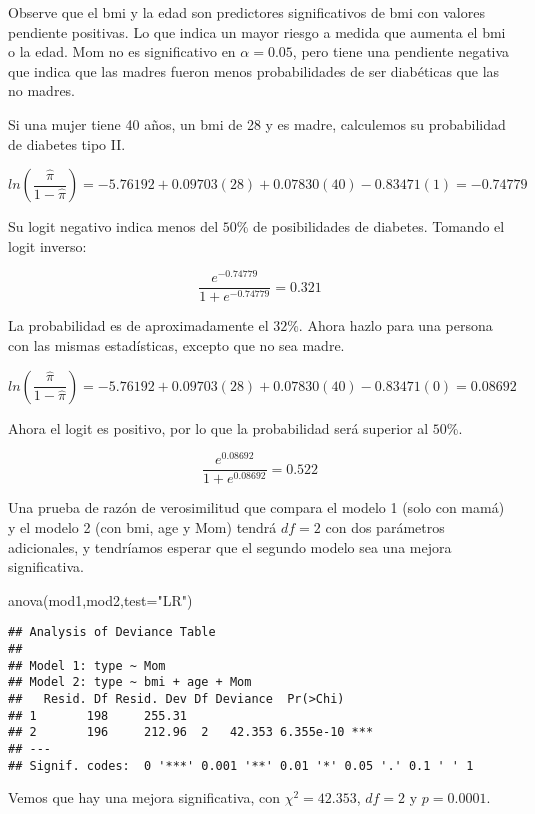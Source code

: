 \documentclass[
]{book}
\newenvironment{Shaded}{\begin{snugshade}}{\end{snugshade}}
\newcommand{\AttributeTok}[1]{\textcolor[rgb]{0.77,0.63,0.00}{#1}}
\newcommand{\FunctionTok}[1]{\textcolor[rgb]{0.00,0.00,0.00}{#1}}
\newcommand{\NormalTok}[1]{#1}
\newcommand{\StringTok}[1]{\textcolor[rgb]{0.31,0.60,0.02}{#1}}
\begin{document}
Observe que el bmi y la edad son predictores significativos de bmi con valores pendiente positivas.
Lo que indica un mayor riesgo a medida que aumenta el bmi o la edad. Mom no es
significativo en \(\alpha=0.05\), pero tiene una pendiente negativa que indica que las madres fueron menos probabilidades de ser diabéticas que las no madres.

Si una mujer tiene 40 años, un bmi de 28 y es madre, calculemos su
probabilidad de diabetes tipo II.

\[ln\left(\frac{\hat{\pi}}{1-\hat{\pi}}\right)=-5.76192 + 0.09703(28) + 0.07830(40)-0.83471(1) = -0.74779 \]

Su logit negativo indica menos del \(50\%\) de posibilidades de diabetes. Tomando el logit inverso:

\[\frac{e^{-0.74779}}{1+e^{-0.74779}}=0.321 \]

La probabilidad es de aproximadamente el \(32\%\). Ahora hazlo para una persona con las mismas estadísticas,
excepto que no sea madre.

\[ ln\left(\frac{\hat{\pi}}{1-\hat{\pi}}\right)=-5.76192 + 0.09703(28) + 0.07830(40)-0.83471(0) = 0.08692\]

Ahora el logit es positivo, por lo que la probabilidad será superior al \(50\%\).

\[\frac{e^{0.08692}}{1+e^{0.08692}}=0.522 \]

Una prueba de razón de verosimilitud que compara el modelo 1 (solo con mamá) y el modelo 2 (con
bmi, age y Mom) tendrá \(df=2\) con dos parámetros adicionales, y tendríamos esperar que el segundo modelo sea una mejora significativa.

\begin{Shaded}
\begin{Highlighting}[]
\FunctionTok{anova}\NormalTok{(mod1,mod2,}\AttributeTok{test=}\StringTok{"LR"}\NormalTok{)}
\end{Highlighting}
\end{Shaded}

\begin{verbatim}
## Analysis of Deviance Table
## 
## Model 1: type ~ Mom
## Model 2: type ~ bmi + age + Mom
##   Resid. Df Resid. Dev Df Deviance  Pr(>Chi)    
## 1       198     255.31                          
## 2       196     212.96  2   42.353 6.355e-10 ***
## ---
## Signif. codes:  0 '***' 0.001 '**' 0.01 '*' 0.05 '.' 0.1 ' ' 1
\end{verbatim}

Vemos que hay una mejora significativa, con \(\chi^2=42.353\), \(df=2\) y \(p=0.0001\).
\end{document}
